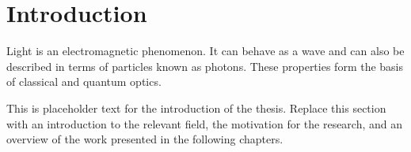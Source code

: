 \chapter{Introduction}

Light is an electromagnetic phenomenon. It can behave as a wave and can also be described in terms of particles known as photons. These properties form the basis of classical and quantum optics.

This is placeholder text for the introduction of the thesis. Replace this section with an introduction to the relevant field, the motivation for the research, and an overview of the work presented in the following chapters.
